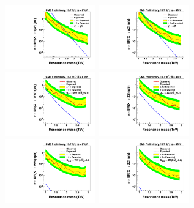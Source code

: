 \begin{figure}[h!tpb]
\begin{center}
\includegraphics[width=0.35\textwidth]{EXO-12-024/figs/limits/brazilianFlag_qW_low_purity.pdf}
\includegraphics[width=0.35\textwidth]{EXO-12-024/figs/limits/brazilianFlag_qZ_low_purity.pdf}\\
\includegraphics[width=0.35\textwidth]{EXO-12-024/figs/limits/brazilianFlag_RS1WW_low_purity.pdf}
\includegraphics[width=0.35\textwidth]{EXO-12-024/figs/limits/brazilianFlag_RS1ZZ_low_purity.pdf}\\
\includegraphics[width=0.35\textwidth]{EXO-12-024/figs/limits/brazilianFlag_BulkWW_low_purity.pdf}
\includegraphics[width=0.35\textwidth]{EXO-12-024/figs/limits/brazilianFlag_BulkZZ_low_purity.pdf}\\

\end{center}
\end{figure}

